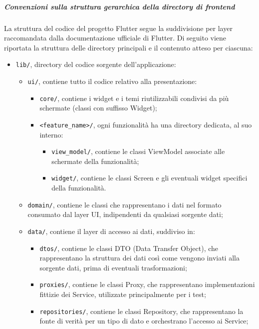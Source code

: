 \documentclass[a4paper,12pt]{article}
\begin{document}
\subparagraph{Convenzioni sulla struttura gerarchica della directory di frontend} \label{subpar:convenzioni-gerarchia-dir-fe}
La struttura del codice del progetto Flutter segue la suddivisione per layer raccomandata dalla documentazione ufficiale di Flutter. 
Di seguito viene riportata la struttura delle directory principali e il contenuto atteso per ciascuna:
\begin{itemize}
    \item \texttt{lib/}, directory del codice sorgente dell'applicazione:
    \begin{itemize}
        \item \texttt{ui/}, contiene tutto il codice relativo alla presentazione:
        \begin{itemize}
            \item \texttt{core/}, contiene i widget e i temi riutilizzabili condivisi da più schermate (classi con suffisso Widget);
            \item \texttt{<feature\_name>/}, ogni funzionalità ha una directory dedicata, al suo interno:
            \begin{itemize}
                \item \texttt{view\_model/}, contiene le classi ViewModel associate alle schermate della funzionalità;
                \item \texttt{widget/}, contiene le classi Screen e gli eventuali widget specifici della funzionalità.
            \end{itemize}
        \end{itemize}
        \item \texttt{domain/}, contiene le classi che rappresentano i dati nel formato consumato dal layer UI, indipendenti da qualsiasi sorgente dati;
        \item \texttt{data/}, contiene il layer di accesso ai dati, suddiviso in:
        \begin{itemize}
            \item \texttt{dtos/}, contiene le classi DTO (Data Transfer Object), che rappresentano la struttura dei dati così come vengono inviati alla sorgente dati, prima di eventuali trasformazioni;
            \item \texttt{proxies/}, contiene le classi Proxy, che rappresentano implementazioni fittizie dei Service, utilizzate principalmente per i test;
            \item \texttt{repositories/}, contiene le classi Repository, che rappresentano la fonte di verità per un tipo di dato e orchestrano l'accesso ai Service;

\end{itemize}
\end{itemize}
\end{itemize}
\end{document}
